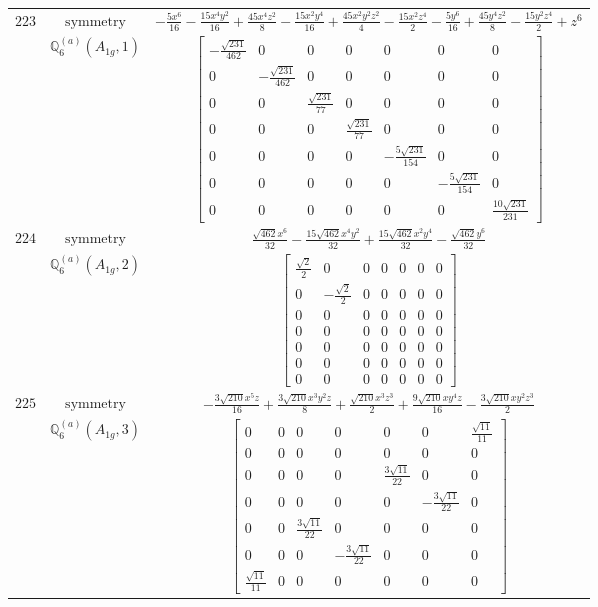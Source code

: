 \documentclass[fleqn,8pt,landscape]{jsarticle}
\begin{document}
\begin{longtable}{ccc}
$ 223 $ & $ \text{symmetry} $ & $ - \frac{5 x^{6}}{16} - \frac{15 x^{4} y^{2}}{16} + \frac{45 x^{4} z^{2}}{8} - \frac{15 x^{2} y^{4}}{16} + \frac{45 x^{2} y^{2} z^{2}}{4} - \frac{15 x^{2} z^{4}}{2} - \frac{5 y^{6}}{16} + \frac{45 y^{4} z^{2}}{8} - \frac{15 y^{2} z^{4}}{2} + z^{6} $ \\
$  $ & $ \mathbb{Q}_{6}^{(a)}(A_{1g},1) $ & $ \begin{bmatrix} - \frac{\sqrt{231}}{462} & 0 & 0 & 0 & 0 & 0 & 0 \\ 0 & - \frac{\sqrt{231}}{462} & 0 & 0 & 0 & 0 & 0 \\ 0 & 0 & \frac{\sqrt{231}}{77} & 0 & 0 & 0 & 0 \\ 0 & 0 & 0 & \frac{\sqrt{231}}{77} & 0 & 0 & 0 \\ 0 & 0 & 0 & 0 & - \frac{5 \sqrt{231}}{154} & 0 & 0 \\ 0 & 0 & 0 & 0 & 0 & - \frac{5 \sqrt{231}}{154} & 0 \\ 0 & 0 & 0 & 0 & 0 & 0 & \frac{10 \sqrt{231}}{231} \end{bmatrix} $ \\ \hline
$ 224 $ & $ \text{symmetry} $ & $ \frac{\sqrt{462} x^{6}}{32} - \frac{15 \sqrt{462} x^{4} y^{2}}{32} + \frac{15 \sqrt{462} x^{2} y^{4}}{32} - \frac{\sqrt{462} y^{6}}{32} $ \\
$  $ & $ \mathbb{Q}_{6}^{(a)}(A_{1g},2) $ & $ \begin{bmatrix} \frac{\sqrt{2}}{2} & 0 & 0 & 0 & 0 & 0 & 0 \\ 0 & - \frac{\sqrt{2}}{2} & 0 & 0 & 0 & 0 & 0 \\ 0 & 0 & 0 & 0 & 0 & 0 & 0 \\ 0 & 0 & 0 & 0 & 0 & 0 & 0 \\ 0 & 0 & 0 & 0 & 0 & 0 & 0 \\ 0 & 0 & 0 & 0 & 0 & 0 & 0 \\ 0 & 0 & 0 & 0 & 0 & 0 & 0 \end{bmatrix} $ \\ \hline
$ 225 $ & $ \text{symmetry} $ & $ - \frac{3 \sqrt{210} x^{5} z}{16} + \frac{3 \sqrt{210} x^{3} y^{2} z}{8} + \frac{\sqrt{210} x^{3} z^{3}}{2} + \frac{9 \sqrt{210} x y^{4} z}{16} - \frac{3 \sqrt{210} x y^{2} z^{3}}{2} $ \\
$  $ & $ \mathbb{Q}_{6}^{(a)}(A_{1g},3) $ & $ \begin{bmatrix} 0 & 0 & 0 & 0 & 0 & 0 & \frac{\sqrt{11}}{11} \\ 0 & 0 & 0 & 0 & 0 & 0 & 0 \\ 0 & 0 & 0 & 0 & \frac{3 \sqrt{11}}{22} & 0 & 0 \\ 0 & 0 & 0 & 0 & 0 & - \frac{3 \sqrt{11}}{22} & 0 \\ 0 & 0 & \frac{3 \sqrt{11}}{22} & 0 & 0 & 0 & 0 \\ 0 & 0 & 0 & - \frac{3 \sqrt{11}}{22} & 0 & 0 & 0 \\ \frac{\sqrt{11}}{11} & 0 & 0 & 0 & 0 & 0 & 0 \end{bmatrix} $ \\ \hline

\end{longtable}
\end{document}
